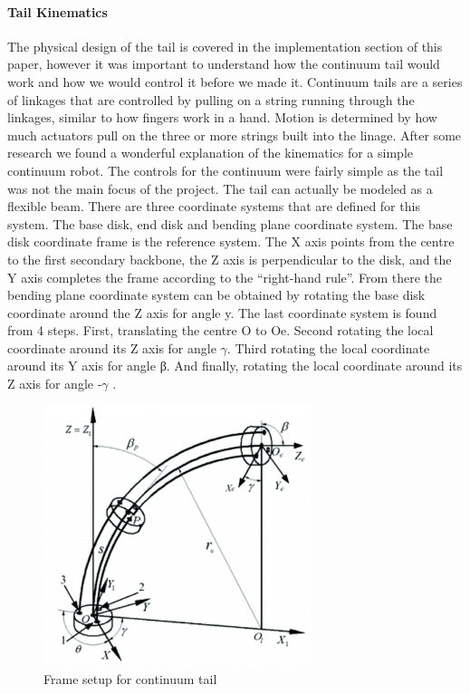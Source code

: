              \paragraph{Tail Kinematics} The physical design of the tail is covered in the implementation section of this paper, however it was important to understand how the continuum tail would work and how we would control it before we made it. Continuum tails are a series of linkages that are controlled by pulling on a string running through the linkages, similar to how fingers work in a hand. Motion is determined by how much actuators pull on the three or more strings built into the linage. After some research we found a wonderful explanation of the kinematics for a simple continuum robot. The controls for the continuum were fairly simple as the tail was not the main focus of the project. The tail can actually be modeled as a flexible beam. There are three coordinate systems that are defined for this system. The base disk, end disk and bending plane coordinate system. The base disk coordinate frame is the reference system. The X axis points from the centre to the first secondary backbone, the Z axis is perpendicular to the disk, and the Y axis completes the frame  according to the “right-hand rule”. From there the bending plane coordinate system can be obtained by rotating the base disk coordinate around the Z axis for angle y. The last coordinate system is found from 4 steps. First, translating the centre O to Oe. Second rotating the local coordinate around its Z axis for angle $\gamma$. Third rotating the local coordinate around its Y axis for angle β. And finally, rotating the local coordinate around its Z axis for angle -$\gamma$ \cite{wang_li_xie_shen}.
             
             
             \begin{figure}[H]
                    \centering
                    \includegraphics[width=0.7\textwidth]{figures/Framesetup.PNG}
                    \caption{Frame setup for continuum tail \cite{wang_li_xie_shen}}
                    \label{fig:ContinuumKinematics}
            \end{figure}  
            
